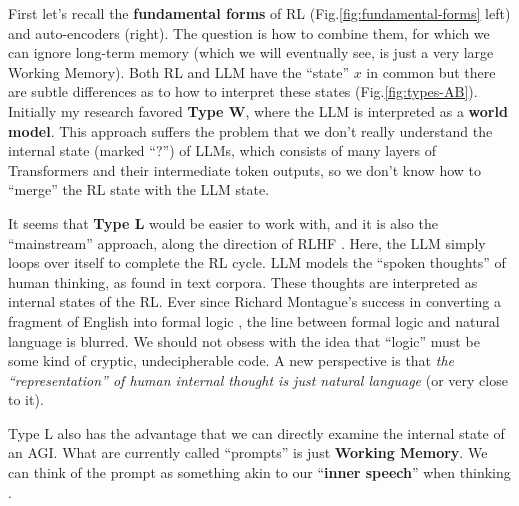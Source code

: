 \documentclass[runningheads]{llncs}
\begin{document}
First let's recall the \textbf{fundamental forms} of RL (Fig.\ref{fig:fundamental-forms} left) and auto-encoders (right).  The question is how to combine them, for which we can ignore long-term memory (which we will eventually see, is just a very large Working Memory).  Both RL and LLM have the ``state'' $x$ in common but there are subtle differences as to how to interpret these states (Fig.\ref{fig:types-AB}).  Initially my research favored \textbf{Type W}, where the LLM is interpreted as a \textbf{world model}.  This approach suffers the problem that we don't really understand the internal state (marked ``?'') of LLMs, which consists of many layers of Transformers and their intermediate token outputs, so we don't know how to ``merge'' the RL state with the LLM state.


It seems that \textbf{Type L} would be easier to work with, and it is also the ``mainstream'' approach, along the direction of RLHF \cite{Li2023}.  Here, the LLM simply loops over itself to complete the RL cycle.  LLM models the ``spoken thoughts'' of human thinking, as found in text corpora.  These thoughts are interpreted as internal states of the RL.  Ever since Richard Montague's success in converting a fragment of English into formal logic \cite{Montague1970} \cite{Montague1973}, the line between formal logic and natural language is blurred.  We should not obsess with the idea that ``logic'' must be some kind of cryptic, undecipherable code.  A new perspective is that \textit{the ``representation'' of human internal thought is just natural language} (or very close to it).

Type L also has the advantage that we can directly examine the internal state of an AGI.  What are currently called ``prompts'' is just \textbf{Working Memory}.  We can think of the prompt as something akin to our ``\textbf{inner speech}'' when thinking \cite{Haikonen2012}.
\end{document}
